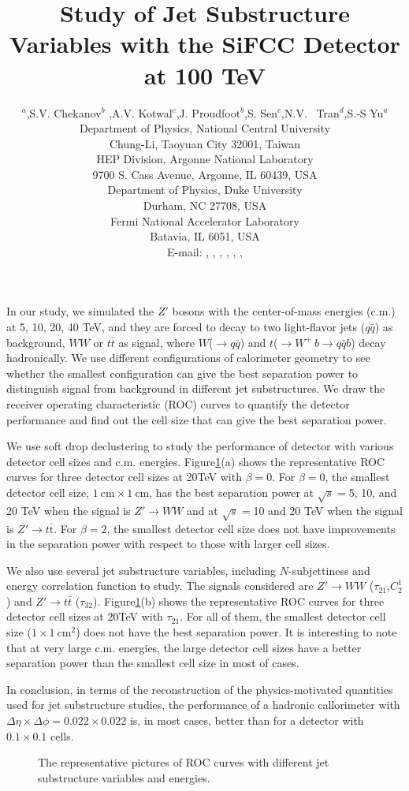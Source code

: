 \documentclass[a4paper]{PoS}
\title{Study of Jet Substructure Variables with the SiFCC Detector at 100 TeV}
\author{\speaker{C.-H Yeh}$^a$,S.V. Chekanov$^b$ ,A.V. Kotwal$^{c}$,J. Proudfoot$^{b}$,S. Sen$^{c}$,N.V. ~Tran$^{d}$,S.-S Yu$^{a}$\\     
     \llap{$^a$}Department of Physics, National Central University\\
     Chung-Li, Taoyuan City 32001, Taiwan\\
     \llap{$^b$}HEP Division, Argonne National Laboratory\\
     9700 S. Cass Avenue, Argonne, IL 60439, USA\\
     \llap{$^c$}Department of Physics, Duke University\\
     Durham, NC 27708, USA\\
     \llap{$^d$}Fermi National Accelerator Laboratory\\
     Batavia, IL 6051, USA\\
     E-mail:  \email{a9510130375@gmail.com},
     \email{chekanov@anl.gov},
     \email{kotwal@phy.duke.edu},
     \email{proudfoot@anl.gov},
     \email{sourav.sen@duke.edu},
     \email{ntran@fnal.gov},
     \email{syu@phy.ncu.edu.tw}}
\begin{document}
In our study, we simulated the $Z'$ bosons with the center-of-mass energies (c.m.) at 5, 10, 20, 40 TeV, and they are forced to decay to two light-flavor jets ($q\bar{q}$) as background, $W W$ or $t\bar{t}$ as signal, where $W$($\rightarrow$$q\bar{q}$) and $t$($ \rightarrow  W^+\>b \rightarrow q\bar{q} b$) decay hadronically. We use different configurations of calorimeter geometry to see whether the smallest configuration can give the best separation power to distinguish signal from background in different jet substructures. We draw the receiver operating characteristic (ROC) curves to quantify the detector performance and find out the cell size that can give the best separation power.

We use soft drop declustering\cite{Larkoski:2014wba} to study the performance of detector with various detector cell sizes and c.m. energies. Figure\ref{1}(a) shows the representative ROC curves for three detector cell sizes at 20TeV with $\beta=0$. For $\beta=0$, the smallest detector cell size, $1~\mathrm{cm}\times1~\mathrm{cm}$, has the best separation power at $\sqrt{s}=$5, 10, and 20 TeV when the signal is $Z' \rightarrow WW$ and at $\sqrt{s}=$10 and 20 TeV when the signal is $Z' \rightarrow t\bar{\mathrm{t}}$. For $\beta=2$, the smallest detector cell size does not have improvements in the separation power with respect to those with larger cell sizes.

We also use several jet substructure variables, including $N$-subjettiness\cite{Thaler:2010tr} and energy correlation function\cite{Larkoski:2013eya} to study. The signals considered are $Z'\rightarrow WW$ ($\tau_{21}$,$C_2^1$) and $Z' \rightarrow t\bar{t}$ ($\tau_{32}$). Figure\ref{1}(b) shows the representative ROC curves for three detector cell sizes at 20TeV with $\tau_{21}$. For all of them, the smallest detector cell size ($1\times1~\mathrm{cm}^2$) does not have the best separation power. It is interesting to note that at very large c.m. energies, the large detector cell sizes have a better separation power than the smallest cell size in most of cases. 



In conclusion, in terms of the reconstruction of the physics-motivated quantities  
used for jet substructure studies, the  performance 
of a  hadronic callorimeter  with 
$\Delta \eta \times \Delta \phi = 0.022\times0.022$ is, in most cases,
better than for a detector with  $0.1\times0.1$ cells.


\begin{figure}
\begin{center}
\end{center}
\caption{The representative pictures of ROC curves with different jet substructure variables and energies.}
\label{1}
\end{figure}
\end{document}
